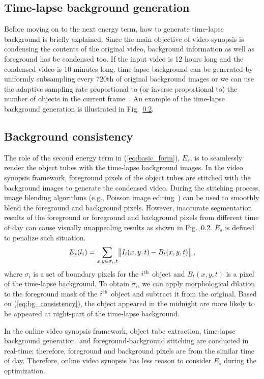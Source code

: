 \documentclass[11pt]{hyu_thesis}
\begin{document}
\subsection{Time-lapse background generation}
Before moving on to the next energy term, how to generate time-lapse background is briefly explained. Since the main objective of video synopsis is condensing the contents of the original video, background information as well as foreground has be condensed too. If the input video is 12 hours long and the condensed video is 10 minutes long, time-lapse background can be generated by uniformly subsampling every 720th of original background images or we can use the adaptive sampling rate proportional to (or inverse proportional to) the number of objects in the current frame~\cite{}. An example of the time-lapse background generation is illustrated in Fig.~\ref{}.

\subsection{Background consistency}
The role of the second energy term in (\ref{eq:basic_form}), $E_s$, is to seamlessly render the object tubes with the time-lapse background images. In the video synopsis framework, foreground pixels of the object tubes are stitched with the background images to generate the condensed video. During the stitching process, image blending algorithms (e.g., Poisson image editing~\cite{}) can be used to smoothly blend the foreground and background pixels. However, inaccurate segmentation results of the foreground or foreground and background pixels from different time of day can cause visually unappealing results as shown in Fig.~\ref{}. $E_s$ is defined to penalize such situation.
\begin{equation}
\label{eq:bg_consistency}
E_s(l_i)=\sum_{x,y \in \sigma_i,t}\norm{I_i(x,y,t)-B_t(x,y,t)},
\end{equation}
where $\sigma_i$ is a set of boundary pixels for the $i^{\rm{th}}$ object and $B_t(x,y,t)$ is a pixel of the time-lapse background. To obtain $\sigma_i$, we can apply morphological dilation to the foreground mask of the $i^{\rm{th}}$ object and subtract it from the original. Based on (\ref{eq:bg_consistency}), the object appeared in the midnight are more likely to be appeared at night-part of the time-lapse background.

In the online video synopsis framework, object tube extraction, time-lapse background generation, and foreground-background stitching are conducted in real-time; therefore, foreground and background pixels are from the similar time of day. Therefore, online video synopsis has less reason to consider $E_s$ during the optimization.
\end{document}
